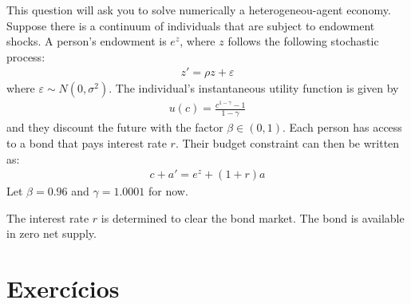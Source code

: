 \documentclass[10pt]{article}
\newcommand\0{\mathbf{0}}
\newcounter{exercise}
\begin{document}
\newdimen\headerwidth


\begin{center}
\end{center}

This question will ask you to solve numerically a heterogeneou-agent economy. Suppose there is a continuum of individuals that are subject to endowment shocks. A person's endowment is $e^z$, where $z$ follows the following stochastic process:
\begin{align*}
z' = \rho z  + \varepsilon
\end{align*}
where $\varepsilon \sim N(0, \sigma^2)$. The individual's instantaneous utility function is given by
\begin{align*}
u(c) = \frac{c^{1-\gamma}- 1}{1 - \gamma}
\end{align*}
and they discount the future with the factor $\beta \in (0,1)$. Each person has access to a bond that pays interest rate $r$. Their budget constraint can then be written as:
\begin{align*}
c + a'  = e^z + (1+r)a
\end{align*}
Let $\beta = 0.96$ and $\gamma = 1.0001$ for now. 

The interest rate $r$ is determined to clear the bond market. The bond is
available in zero net supply.


\section*{Exercícios}
\end{document}
